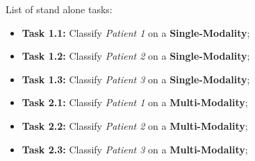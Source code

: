 \hfill


List of stand alone tasks:


\hfill

\begin{itemize}
\item[] \textbf{Task 1.1:} Classify \textit{Patient 1} on a \textbf{Single-Modality};
\item[] \textbf{Task 1.2:} Classify \textit{Patient 2} on a \textbf{Single-Modality};
\item[] \textbf{Task 1.3:} Classify \textit{Patient 3} on a \textbf{Single-Modality};
\end{itemize}

\hfill

\begin{itemize}
\item[] \textbf{Task 2.1:} Classify \textit{Patient 1} on a \textbf{Multi-Modality};
\item[] \textbf{Task 2.2:} Classify \textit{Patient 2} on a \textbf{Multi-Modality};
\item[] \textbf{Task 2.3:} Classify \textit{Patient 3} on a \textbf{Multi-Modality};
\end{itemize}

\hfill


